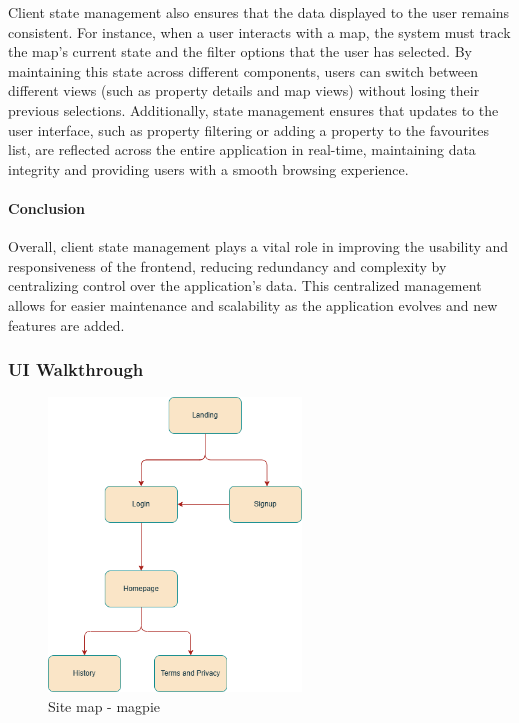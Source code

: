 Client state management also ensures that the data displayed to the user
remains consistent. For instance, when a user interacts with a map, the
system must track the map's current state and the filter options that the
user has selected. By maintaining this state across different components,
users can switch between different views (such as property details and map
views) without losing their previous selections. Additionally, state
management ensures that updates to the user interface, such as property
filtering or adding a property to the favourites list, are reflected across
the entire application in real{-}time, maintaining data integrity and
providing users with a smooth browsing experience.
\paragraph{Conclusion}\mbox{}

Overall, client state management plays a vital role in improving the
usability and responsiveness of the frontend, reducing redundancy and
complexity by centralizing control over the application's data. This
centralized management allows for easier maintenance and scalability as the
application evolves and new features are added.

\newpage{}

\subsubsection{UI Walkthrough}
\begin{figure}[htbp]
    \centering{}
    \includegraphics[width=0.6\textwidth]{images/site/sitemap.png}
    \caption{Site map {-} magpie}
\end{figure}

